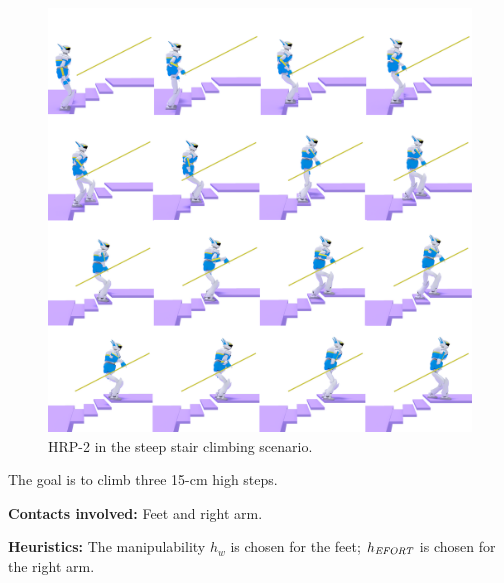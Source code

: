 \begin{figure}
  \centering
  \includegraphics[width=1\linewidth]{figures/stair}
  \caption{
           HRP-2 in the steep stair climbing scenario. }
		   \label{fig:stair_robust}
\end{figure}

The goal is to climb three 15-cm high steps.

\noindent\textbf{Contacts involved:} Feet and right arm.

\noindent\textbf{Heuristics:} The manipulability $h_w$ is chosen for the feet; $h_{\textrm{\it EFORT}}$ is chosen for the right arm.

